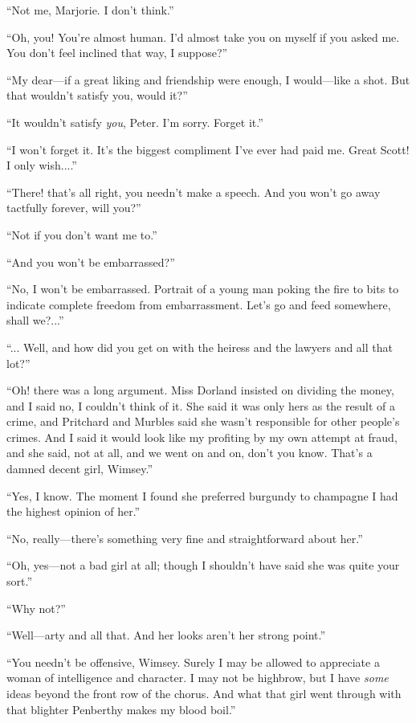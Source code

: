 \enquote{Not me, Marjorie. I don't think.}

\enquote{Oh, you! You're almost human. I'd almost take you on myself if you asked me. You don't feel inclined that way, I suppose?}

\enquote{My dear\allowbreak---\allowbreak if a great liking and friendship were enough, I would\allowbreak---\allowbreak like a shot. But that wouldn't satisfy you, would it?}

\enquote{It wouldn't satisfy \textit{you}, Peter. I'm sorry. Forget it.}

\enquote{I won't forget it. It's the biggest compliment I've ever had paid me. Great Scott! I only wish....}

\enquote{There! that's all right, you needn't make a speech. And you won't go away tactfully forever, will you?}

\enquote{Not if you don't want me to.}

\enquote{And you won't be embarrassed?}

\enquote{No, I won't be embarrassed. Portrait of a young man poking the fire to bits to indicate complete freedom from embarrassment. Let's go and feed somewhere, shall we?...}

\enquote{... Well, and how did you get on with the heiress and the lawyers and all that lot?}

\enquote{Oh! there was a long argument. Miss Dorland insisted on dividing the money, and I said no, I couldn't think of it. She said it was only hers as the result of a crime, and Pritchard and Murbles said she wasn't responsible for other people's crimes. And I said it would look like my profiting by my own attempt at fraud, and she said, not at all, and we went on and on, don't you know. That's a damned decent girl, Wimsey.}

\enquote{Yes, I know. The moment I found she preferred burgundy to champagne I had the highest opinion of her.}

\enquote{No, really\allowbreak---\allowbreak there's something very fine and straightforward about her.}

\enquote{Oh, yes\allowbreak---\allowbreak not a bad girl at all; though I shouldn't have said she was quite your sort.}

\enquote{Why not?}

\enquote{Well\allowbreak---\allowbreak arty and all that. And her looks aren't her strong point.}

\enquote{You needn't be offensive, Wimsey. Surely I may be allowed to appreciate a woman of intelligence and character. I may not be highbrow, but I have \textit{some} ideas beyond the front row of the chorus. And what that girl went through with that blighter Penberthy makes my blood boil.}

